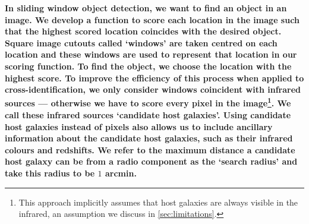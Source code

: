 \documentclass[fleqn,usenatbib,usedcolumn]{mnras}
\newcommand{\edited}[1]{{\bf {#1}}}
\begin{document}
    \edited{In sliding window object detection, we want to find an object in an image.
    We develop a function to score each location in the image
    such that the highest scored location coincides with the desired object. Square image
    cutouts called `windows' are taken centred on each location and these
    windows are used to represent that location in our scoring function.
    To find the object, we choose the location with the highest score. To improve the
    efficiency of this process when applied to cross-identification, we
    only consider windows coincident with infrared sources --- otherwise we have to
    score every pixel in the image\footnote{This approach
    implicitly assumes that host galaxies are always visible in the infrared,
    an assumption we discuss in \autoref{sec:limitations}.}. We call these
    infrared sources `candidate host galaxies'. Using candidate host
    galaxies instead of pixels also allows us to include ancillary information
    about the candidate host galaxies, such as their infrared colours and
    redshifts. We refer to the maximum distance a candidate host galaxy can be from
    a radio component as the `search radius' and take this radius to be $1$ arcmin.}
\end{document}
